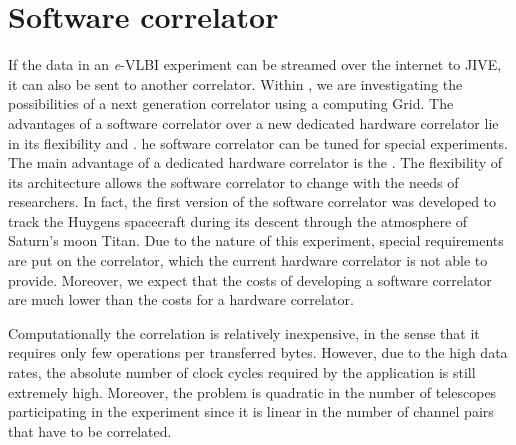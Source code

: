 \section{Software correlator}\label{sec:softwarecorrelation}
If the data in an {\it e}-VLBI experiment can be streamed over the
internet to JIVE, it can also be sent to another correlator. Within
\scarie, we are investigating the possibilities of a next generation
 correlator using a computing Grid. The advantages 
of a software correlator over a new dedicated hardware correlator lie in its
flexibility and . he software correlator can be tuned for
special experiments. The main advantage of a dedicated hardware
correlator is the . 
The flexibility of its architecture allows the software correlator to
change with the needs of researchers. In fact, the first version of
the software correlator was developed to track the Huygens spacecraft
during its descent through the atmosphere of Saturn's moon Titan. Due
to the nature of this experiment, special requirements are put on the
correlator, which the current hardware correlator is not able to
provide.  Moreover, we expect that the costs of developing a software
correlator are much lower than the costs for a hardware correlator.




Computationally the correlation is relatively inexpensive, in the
sense that it requires only few operations per transferred bytes.
However, due to the high data rates, the absolute number of clock
cycles required by the application is still extremely high. Moreover,
the problem is quadratic in the number of telescopes participating in
the experiment since it is linear in the number of channel pairs that
have to be correlated. 



